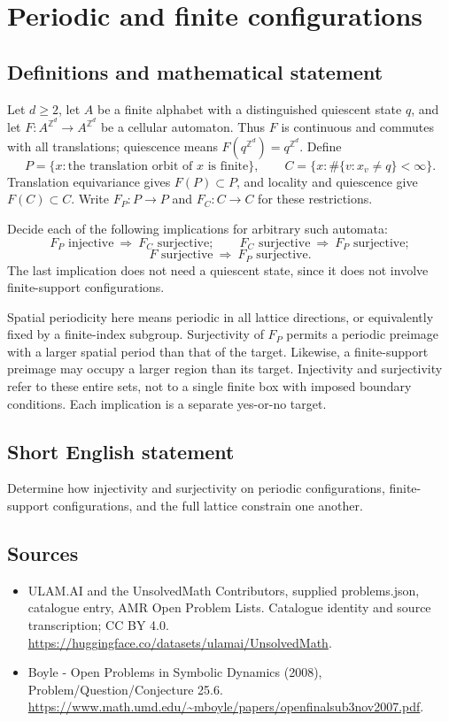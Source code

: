 \documentclass[11pt,a4paper]{article}
\begin{document}
\section*{Periodic and finite configurations}\label{statement}

\subsection{Definitions and mathematical statement}
Let $d\ge2$, let $A$ be a finite alphabet with a distinguished
quiescent state $q$, and let $F:A^{\mathbb Z^d}\to A^{\mathbb Z^d}$
be a cellular automaton. Thus $F$ is continuous and commutes
with all translations; quiescence means $F(q^{\mathbb Z^d})=
q^{\mathbb Z^d}$. Define
\[
 P=\{x:\text{the translation orbit of }x\text{ is finite}\},
 \qquad C=\{x:\#\{v:x_v\ne q\}<\infty\}.
\]
Translation equivariance gives $F(P)\subset P$, and locality
and quiescence give $F(C)\subset C$. Write $F_P:P\to P$
and $F_C:C\to C$ for these restrictions.

Decide each of the following implications for arbitrary such
automata:
\[
 F_P\text{ injective}\ \Longrightarrow\ F_C\text{ surjective};
 \qquad
 F_C\text{ surjective}\ \Longrightarrow\ F_P\text{ surjective};
\]
\[
 F\text{ surjective}\ \Longrightarrow\ F_P\text{ surjective}.
\]
The last implication does not need a quiescent state, since it
does not involve finite-support configurations.

Spatial periodicity here means periodic in all lattice directions,
or equivalently fixed by a finite-index subgroup. Surjectivity
of $F_P$ permits a periodic preimage with a larger spatial
period than that of the target. Likewise, a finite-support
preimage may occupy a larger region than its target. Injectivity
and surjectivity refer to these entire sets, not to a single
finite box with imposed boundary conditions. Each implication
is a separate yes-or-no target.
\subsection{Short English statement}
Determine how injectivity and surjectivity on periodic configurations, finite-support configurations, and the full lattice constrain one another.
\subsection{Sources}
\begin{itemize}
\item[S1] ULAM.AI and the UnsolvedMath Contributors, supplied problems.json, catalogue entry, AMR Open Problem Lists. Catalogue identity and source transcription; CC BY 4.0.
\url{https://huggingface.co/datasets/ulamai/UnsolvedMath}.
\item[S2] Boyle - Open Problems in Symbolic Dynamics (2008), Problem/Question/Conjecture 25.6. 
\url{https://www.math.umd.edu/~mboyle/papers/openfinalsub3nov2007.pdf}.
\end{itemize}
\end{document}
